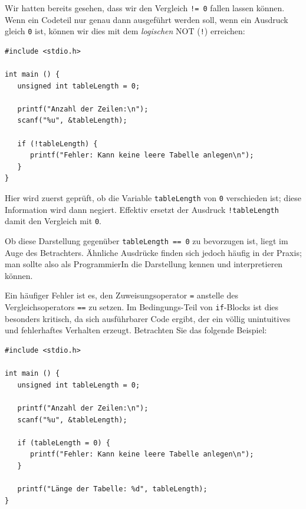 \begin{hintbox}
Wir hatten bereits gesehen, dass wir den Vergleich \texttt{!= 0} fallen lassen können. Wenn ein Codeteil nur genau dann ausgeführt werden soll, wenn ein Ausdruck gleich \texttt{0} ist, können wir dies mit dem \emph{logischen} NOT (\texttt{!}) erreichen:

\begin{codebox}
\begin{verbatim}
#include <stdio.h>

int main () {
   unsigned int tableLength = 0;
   
   printf("Anzahl der Zeilen:\n");
   scanf("%u", &tableLength);
   
   if (!tableLength) {
      printf("Fehler: Kann keine leere Tabelle anlegen\n");
   }
}
\end{verbatim}
\end{codebox}

Hier wird zuerst geprüft, ob die Variable \texttt{tableLength} von \texttt{0} verschieden ist; diese Information wird dann negiert. Effektiv ersetzt der Ausdruck \texttt{!tableLength} damit den Vergleich mit \texttt{0}.

Ob diese Darstellung gegenüber \texttt{tableLength == 0} zu bevorzugen ist, liegt im Auge des Betrachters. Ähnliche Ausdrücke finden sich jedoch häufig in der Praxis; man sollte also als ProgrammierIn die Darstellung kennen und interpretieren können.
\end{hintbox}

\begin{warnbox}[Fehlerquelle: Vergleichsoperator \texttt{==} vs. Zuweisungsoperator \texttt{=}]
Ein häufiger Fehler ist es, den Zuweisungsoperator \texttt{=} anstelle des Vergleichsoperators \texttt{==} zu setzen. Im Bedingungs-Teil von \texttt{if}-Blocks ist dies besonders kritisch, da sich ausführbarer Code ergibt, der ein völlig unintuitives und fehlerhaftes Verhalten erzeugt. Betrachten Sie das folgende Beispiel:

\begin{warnbox}[Beispiel: \texttt{if} mit versehentlicher Wertzuweisung, leftupper=7mm]
\begin{verbatim}
#include <stdio.h>

int main () {
   unsigned int tableLength = 0;
   
   printf("Anzahl der Zeilen:\n");
   scanf("%u", &tableLength);
   
   if (tableLength = 0) {
      printf("Fehler: Kann keine leere Tabelle anlegen\n");
   }
   
   printf("Länge der Tabelle: %d", tableLength);
}
\end{verbatim}
\end{warnbox}
\end{warnbox}

